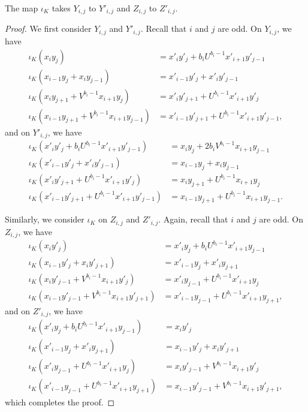\documentclass[10pt,a4paper]{amsart}
\begin{document}
\begin{lemma}\label{lem:YZ}
The map $\iota_K$ takes $Y_{i,j}$ to $Y'_{i,j}$ and $Z_{i,j}$ to $Z'_{i,j}$.
\end{lemma}

\begin{proof}
We first consider $Y_{i,j}$ and $Y'_{i,j}$. Recall that $i$ and $j$ are odd. On $Y_{i,j}$, we have
\begin{align*}
	\iota_K(x_iy_j) &= x'_i y'_j + b_i U^{b_i-1}x'_{i+1} y'_{j-1} \\
	\iota_K( x_{i-1}y_{j}+x_i y_{j-1}) &= x'_{i-1}y'_{j}+x'_i y'_{j-1} \\	
	\iota_K( x_i y_{j+1} + V^{b_i-1}x_{i+1}y_{j}) &= x'_i y'_{j+1} + U^{b_i-1}x'_{i+1}y'_{j} \\	
	\iota_K( x_{i-1}y_{j+1}+V^{b_i-1}x_{i+1} y_{j-1}) &= x'_{i-1}y'_{j+1}+U^{b_i-1}x'_{i+1} y'_{j-1},
\end{align*}
and on $Y'_{i,j}$, we have
\begin{align*}
	\iota_K(x'_iy'_j+ b_i U^{b_i-1}x'_{i+1} y'_{j-1} ) &= x_i y_j + 2b_i V^{b_i-1}x_{i+1} y_{j-1} \\
	\iota_K( x'_{i-1}y'_{j}+x'_i y'_{j-1}) &= x_{i-1}y_{j}+x_i y_{j-1} \\	
	\iota_K( x'_i y'_{j+1} + U^{b_i-1}x'_{i+1}y'_{j}) &= x_i y_{j+1} + U^{b_i-1}x_{i+1}y_{j} \\	
	\iota_K( x'_{i-1}y'_{j+1}+U^{b_i-1}x'_{i+1} y'_{j-1}) &= x_{i-1}y_{j+1}+U^{b_i-1}x_{i+1} y_{j-1}.
\end{align*}

Similarly, we consider $\iota_K$ on $Z_{i,j}$ and $Z'_{i,j}$. Again, recall that $i$ and $j$ are odd. On $Z_{i,j}$, we have
\begin{align*}
	\iota_K(x_i y'_j ) &= x'_i y_j +  b_i U^{b_i-1}x'_{i+1} y_{j-1} \\
	\iota_K(  x_{i-1}y'_{j}+x_i y'_{j+1}) &=   x'_{i-1}y_{j}+x'_i y_{j+1} \\	
	\iota_K( x_i y'_{j-1} + V^{b_i-1}x_{i+1}y'_{j}) &= x'_i y_{j-1} + U^{b_i-1}x'_{i+1}y_{j} \\	
	\iota_K(  x_{i-1}y'_{j-1}+V^{b_i-1}x_{i+1} y'_{j+1} ) &= x'_{i-1}y_{j-1}+U^{b_i-1}x'_{i+1} y_{j+1},
\end{align*}
and on $Z'_{i,j}$, we have
\begin{align*}
	\iota_K(x'_i y_j +  b_i U^{b_i-1}x'_{i+1} y_{j-1}) &=  x_i y'_j\\
	\iota_K( x'_{i-1}y_{j}+x'_i y_{j+1}) &=  x_{i-1}y'_{j}+x_i y'_{j+1}  \\	
	\iota_K( x'_i y_{j-1} + U^{b_i-1}x'_{i+1}y_{j}) &= x_i y'_{j-1} + V^{b_i-1}x_{i+1}y'_{j} \\	
	\iota_K(  x'_{i-1}y_{j-1}+U^{b_i-1}x'_{i+1} y_{j+1}) &=  x_{i-1}y'_{j-1}+V^{b_i-1}x_{i+1} y'_{j+1},
\end{align*}
which completes the proof.
\end{proof}
\end{document}
